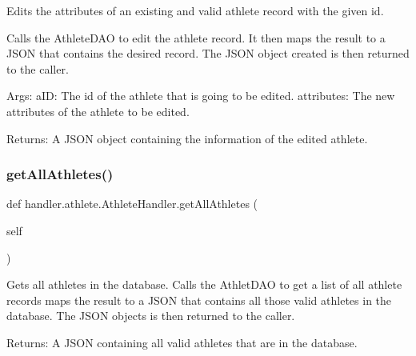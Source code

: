 \begin{DoxyVerb}Edits the attributes of an existing and valid athlete record with
the given id.

Calls the AthleteDAO to edit the athlete record. It then maps the result
to a JSON that contains the desired record. The JSON object created is
then returned to the caller.

Args:
    aID: The id of the athlete that is going to be edited.
    attributes: The new attributes of the athlete to be edited.

Returns:
    A JSON object containing the information of the edited athlete.
\end{DoxyVerb}
 \mbox{\label{classhandler_1_1athlete_1_1_athlete_handler_aae7ac6fee7495a16818e09a8946ead32}} 
\subsubsection{\texorpdfstring{get\+All\+Athletes()}{getAllAthletes()}}
{\footnotesize\ttfamily def handler.\+athlete.\+Athlete\+Handler.\+get\+All\+Athletes (\begin{DoxyParamCaption}\item[{}]{self }\end{DoxyParamCaption})}

\begin{DoxyVerb}Gets all athletes in the database.
Calls the AthletDAO to get a list of all athlete records
maps the result to a JSON that contains all those valid athletes 
in the database. The JSON objects is then returned to the caller.       

Returns:
    A JSON containing all valid athletes that are in the database.
\end{DoxyVerb}
 \mbox{\label{classhandler_1_1athlete_1_1_athlete_handler_a7261ed3d7231ef7bdb261863414be608}} 
